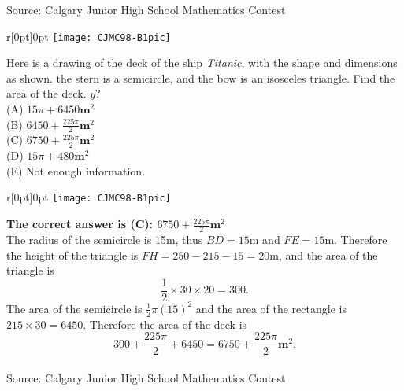 \documentclass{article}
\begin{document}
\scriptsize
Source: Calgary Junior High School Mathematics Contest

\normalsize
\begin{wrapfigure}[4]{r}[0pt]{0pt}
	\texttt{[image: CJMC98-B1pic]}
\end{wrapfigure}
Here is a drawing of the deck of the ship \textit{Titanic}, with the shape and dimensions as shown. the stern is a semicircle, and the bow is an isosceles triangle. Find the area of the deck.
$y$?\\
(A) $15\pi+6450\textbf{m}^2$\\[1 ex]
(B) $6450+\frac{225\pi}{2}\textbf{m}^2$\\[1 ex]
(C) $6750+\frac{225\pi}{2}\textbf{m}^2$\\[1 ex]
(D) $15\pi+480\textbf{m}^2$\\[1 ex]
(E) Not enough information.\\

\begin{wrapfigure}{r}[0pt]{0pt}
	\texttt{[image: CJMC98-B1pic]}
\end{wrapfigure}

\textbf{The correct answer is (C): $6750+\frac{225\pi}{2}\textbf{m}^2$}\\[1 ex]
The radius of the semicircle is 15m, thus $BD=15$m and $FE=15$m.  Therefore the height of the triangle is $FH=250-215-15=20$m, and the area of the triangle is 
\begin{equation*}
\frac{1}{2}\times30\times20=300.
\end{equation*}
The area of the semicircle is $\frac{1}{2}\pi(15)^2$ and the area of the rectangle is $215\times30=6450$. Therefore the area of the deck is 
\begin{equation*}
300+\frac{225\pi}{2}+6450=6750+\frac{225\pi}{2}\textbf{m}^2.
\end{equation*}
\\[5 ex]

\scriptsize
Source: Calgary Junior High School Mathematics Contest
\end{document}

